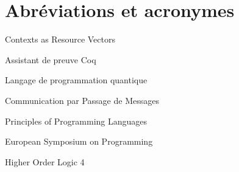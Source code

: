 %
\section*{Abréviations et acronymes}
\label{sec::acronymes}

\vspace{10 mm}
\begin{description}[align=right,labelwidth=2cm] 
\item [CARVe] Contexts as Resource Vectors
\item [Coq] Assistant de preuve Coq
\item [ProtoQuipper] Langage de programmation quantique
\item [CP] Communication par Passage de Messages
\item [POPL] Principles of Programming Languages
\item [ESOP] European Symposium on Programming
\item [HOL4] Higher Order Logic 4
\end{description}
